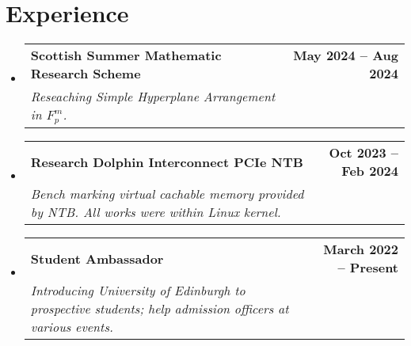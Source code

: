 \documentclass[letterpaper,11pt]{article}
\makeatletter
\newcommand{\resumeSubheading}[4]{
  \vspace{-2pt}\item
    \begin{tabular*}{1.0\textwidth}[t]{l@{\extracolsep{\fill}}r}
      \textbf{#1} & \textbf{\small #2} \\
      \textit{\small#3} & \textit{\small #4} \\
    \end{tabular*}\vspace{-7pt}
}
\newcommand{\resumeSubHeadingListStart}{\begin{itemize}[leftmargin=0.0in, label={}]}
\newcommand{\resumeSubHeadingListEnd}{\end{itemize}}
\makeatother
\begin{document}


\section{Experience}
  \resumeSubHeadingListStart
  \resumeSubheading
  {Scottish Summer Mathematic Research Scheme}{May 2024 -- Aug 2024} {Reseaching Simple Hyperplane Arrangement in $F_p^m$.}{}
    \resumeSubheading
	{Research Dolphin Interconnect PCIe NTB}{Oct 2023 -- Feb 2024}
	{Bench marking virtual cachable memory provided by NTB. All works were within Linux kernel.}{}
    \resumeSubheading
      {Student Ambassador}{March 2022 -- Present}
      {Introducing University of Edinburgh to prospective students; help admission officers at various events.}{}
  \resumeSubHeadingListEnd
\end{document}
